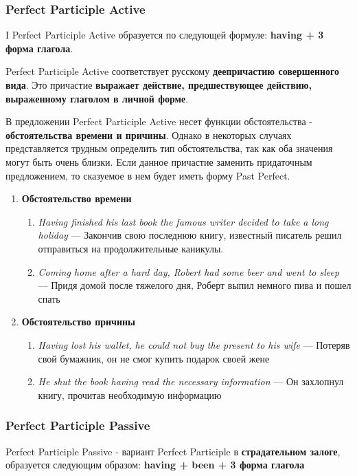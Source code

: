 \documentclass{article}
\begin{document}
\subsubsection{Perfect Participle Active}

I Perfect Participle Active образуется по следующей формуле: \textbf{having + 3 форма глагола}.

Perfect Participle Active соответствует русскому \textbf{деепричастию совершенного вида}. Это причастие \textbf{выражает действие, предшествующее действию, выраженному глаголом в личной форме}.

В предложении Perfect Participle Active несет функции обстоятельства - \textbf{обстоятельства времени и причины}. Однако в некоторых случаях представляется трудным определить тип обстоятельства, так как оба значения могут быть очень близки. Если данное причастие заменить придаточным предложением, то сказуемое в нем будет иметь форму Past Perfect.

\begin{enumerate}
	\item \textbf{Обстоятельство времени}
	\begin{enumerate}
		\item \emph{Having finished his last book the famous writer decided to take a long holiday} — Закончив свою последнюю книгу, известный писатель решил отправиться на продолжительные каникулы.
		\item \emph{Coming home after a hard day, Robert had some beer and went to sleep} — Придя домой после тяжелого дня, Роберт выпил немного пива и пошел спать
	\end{enumerate}
	\item \textbf{Обстоятельство причины}
	\begin{enumerate}
		\item \emph{Having lost his wallet, he could not buy the present to his wife} — Потеряв свой бумажник, он не смог купить подарок своей жене
		\item \emph{He shut the book having read the necessary information} — Он захлопнул книгу, прочитав необходимую информацию
	\end{enumerate}
\end{enumerate}

\subsubsection{Perfect Participle Passive}

Perfect Participle Passive - вариант Perfect Participle в \textbf{страдательном залоге}, образуется следующим образом: \textbf{having + been + 3 форма глагола}
\end{document}
